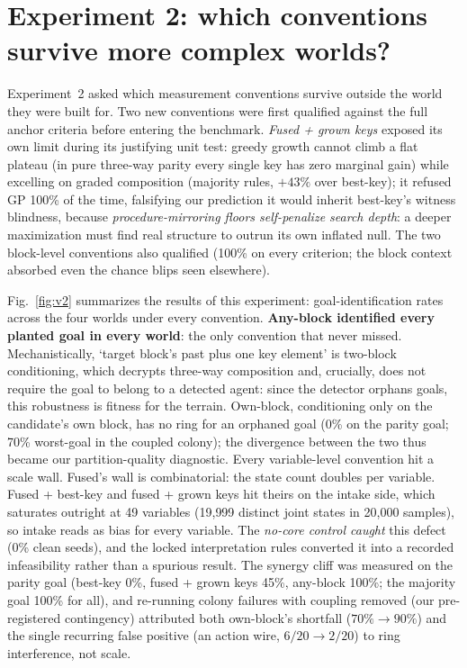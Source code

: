\documentclass[11pt]{article}
\begin{document}
\section{Experiment 2: which conventions survive more complex worlds?}\label{sec:v2}

Experiment~2 asked which measurement conventions survive outside the world they were
built for. Two new conventions were first qualified against the full anchor criteria
before entering the benchmark. \emph{Fused + grown keys} exposed its own limit during its justifying unit test:
greedy growth cannot climb a flat plateau (in pure three-way parity every single key
has zero marginal gain) while excelling on graded composition (majority rules,
$+43\%$ over best-key); it refused GP 100\% of the time, falsifying our prediction it would
inherit best-key's witness blindness, because \emph{procedure-mirroring floors
self-penalize search depth}: a deeper maximization must find real structure to outrun
its own inflated null. The two block-level conventions also qualified (100\% on every
criterion; the block context absorbed even the chance blips seen elsewhere).

Fig.~\ref{fig:v2} summarizes the results of this experiment: goal-identification
rates across the four worlds under every convention.
\textbf{Any-block identified every planted goal in every world}: the only convention
that never missed. Mechanistically, `target block's past plus one key element' is
two-block conditioning, which decrypts three-way composition and, crucially, does not
require the goal to belong to a detected agent: since the detector orphans goals, this
robustness is fitness for the terrain. Own-block, conditioning only on the candidate's
own block, has no ring for an orphaned goal (0\% on the parity goal; 70\% worst-goal in
the coupled colony); the divergence between the two thus became our partition-quality
diagnostic. Every variable-level convention hit a scale wall. Fused's wall is
combinatorial: the state count doubles per variable. Fused + best-key and fused +
grown keys hit
theirs on the intake side, which saturates outright at 49 variables (19{,}999 distinct
joint states in 20{,}000 samples), so intake reads as bias for every variable. The
\emph{no-core control caught} this defect (0\% clean seeds), and the locked
interpretation rules converted it into a recorded infeasibility rather than a
spurious result. The synergy cliff
was measured on the parity goal (best-key 0\%, fused + grown keys 45\%, any-block
100\%; the majority
goal 100\% for all), and re-running colony failures with coupling removed (our pre-registered contingency) attributed both own-block's shortfall ($70\%\to 90\%$) and
the single recurring false positive (an action wire, $6/20\to 2/20$) to ring interference, not scale.
\end{document}
